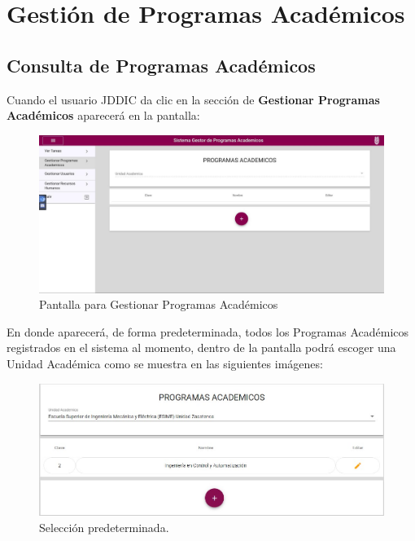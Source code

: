 \section{Gestión de Programas Académicos}
    \subsection{Consulta de Programas Académicos}
        Cuando el usuario JDDIC da clic en la sección de \textbf{Gestionar Programas Académicos} aparecerá en la pantalla:

        \begin{figure}[H]
        	\centering
        	\hypertarget{consultarpa}{\includegraphics[width=0.7\linewidth]{images/SP3/ConsultarPA}}
        	\caption{Pantalla para Gestionar Programas Académicos}
        	\label{consultarpa}
        \end{figure}

          En donde aparecerá, de forma predeterminada, todos los Programas Académicos  registrados en el sistema al momento, dentro de la pantalla podrá escoger una Unidad Académica  como se muestra  en las siguientes imágenes:

         \begin{figure}[H]
                \centering
                \hypertarget{prede}{\includegraphics[width=0.7\linewidth]{images/SP3/Predeterminado}}
                \caption{Selección predeterminada.}
                \label{prede}
            \end{figure}

